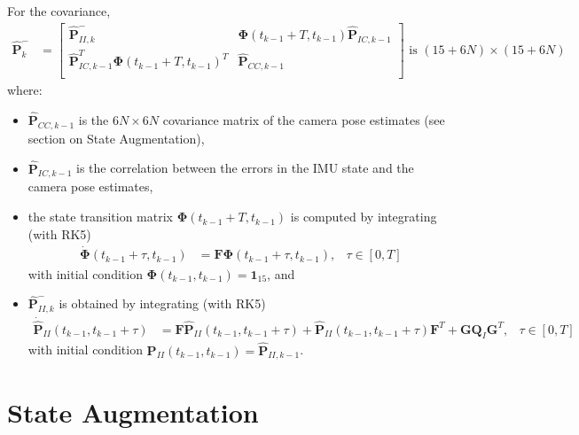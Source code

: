 \documentclass[10pt,letterpaper,fleqn,oneside]{article}
\newcommand{\nl}{\\[0.5em]}
\def\Vec#1{\mathbf{#1}} %
\newcommand{\bbm}{\begin{bmatrix}}
\newcommand{\ebm}{\end{bmatrix}}
\begin{document}
For the covariance,
\begin{align}
\hat{\Vec{P}}^-_k &= \bbm	\hat{\Vec{P}}^-_{II, k} & \boldsymbol{\Phi}\left(t_{k-1} + T, t_{k-1}\right)\hat{\Vec{P}}_{IC, k-1}\nl
											\hat{\Vec{P}}_{IC, k-1}^T \boldsymbol{\Phi}\left(t_{k-1} + T, t_{k-1}\right)^T & \hat{\Vec{P}}_{CC, k-1}\nl
								\ebm \text{ is }\left(15 + 6N\right)\times\left(15 + 6N\right)
\end{align}
where:
\begin{itemize}
\item $\hat{\Vec{P}}_{CC, k-1}$ is the $6N\times6N$ covariance matrix of the camera pose estimates (see section on State Augmentation), 
\item $\hat{\Vec{P}}_{IC, k-1}$ is the correlation between the errors in the IMU state and the camera pose estimates,
\item the state transition matrix $\boldsymbol{\Phi}\left(t_{k-1} + T, t_{k-1}\right)$ is computed by integrating (with RK5)
\begin{align}
\dot{\boldsymbol{\Phi}}\left(t_{k-1} + \tau, t_{k-1}\right) &= \Vec{F}\boldsymbol{\Phi}\left(t_{k-1} + \tau, t_{k-1}\right), &\tau\in\left[0,T\right]
\end{align}
with initial condition $\boldsymbol{\Phi}\left(t_{k-1}, t_{k-1}\right) = \Vec{1}_{15}$, and
\item $\hat{\Vec{P}}^-_{II, k}$ is obtained by integrating (with RK5)
\begin{align}
\dot{\hat{\Vec{P}}}_{II}\left(t_{k-1}, t_{k-1}+\tau\right) &= \Vec{F}\hat{\Vec{P}}_{II}\left(t_{k-1}, t_{k-1}+\tau\right) + \hat{\Vec{P}}_{II}\left(t_{k-1}, t_{k-1}+\tau\right)\Vec{F}^T + \Vec{G}\Vec{Q}_I\Vec{G}^T, &\tau\in\left[0,T\right]
\end{align}
with initial condition $\Vec{P}_{II}\left(t_{k-1}, t_{k-1}\right) = \hat{\Vec{P}}_{II, k-1}$.
\end{itemize}


\section{State Augmentation}
\end{document}
